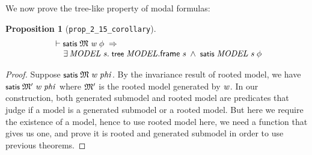 \documentclass[letterpaper]{article}
\newtheorem{prop}{Proposition}
\renewcommand{\HOLConst}[1]{{\textsf{\upshape\small #1}}}
\renewcommand{\HOLinline}[1]{\ensuremath{#1}}
\newenvironment{holmath}{\begin{displaymath}\begin{array}{l}}{\end{array}\end{displaymath}\ignorespacesafterend}
\begin{document}
We now prove the tree-like property of modal formulas:
\begin{prop}[\texttt{prop_2_15_corollary}]
\begin{holmath}
  \ensuremath{\HOLTokenTurnstile}\HOLConst{satis}\;\HOLFreeVar{\ensuremath{\mathfrak{M}}}\;\HOLFreeVar{w}\;\HOLFreeVar{\ensuremath{\phi}}\;\HOLSymConst{\HOLTokenImp{}}\\
\;\;\;\;\;\HOLSymConst{\HOLTokenExists{}}\HOLBoundVar{MODEL}\;\HOLBoundVar{s}.\;\HOLConst{tree}\;\HOLBoundVar{MODEL}.\HOLFieldName{frame}\;\HOLBoundVar{s}\;\HOLSymConst{\HOLTokenConj{}}\;\HOLConst{satis}\;\HOLBoundVar{MODEL}\;\HOLBoundVar{s}\;\HOLFreeVar{\ensuremath{\phi}}
\end{holmath}
\end{prop}
\begin{proof}
  Suppose \HOLinline{\HOLConst{satis}\;\HOLFreeVar{\ensuremath{\mathfrak{M}}}\;\HOLFreeVar{w}\;\HOLFreeVar{phi}}. By the invariance result of rooted model, we have \HOLinline{\HOLConst{satis}\;\HOLFreeVar{\ensuremath{\mathfrak{M}'}}\;\HOLFreeVar{w}\;\HOLFreeVar{phi}} where \HOLinline{\HOLFreeVar{\ensuremath{\mathfrak{M}'}}} is the rooted model generated by \HOLinline{\HOLFreeVar{w}}. In our construction, both generated submodel and rooted model are predicates that judge if a model is a generated submodel or a rooted model. But here we require the existence of a model, hence to use rooted model here, we need a function that gives us one, and prove it is rooted and generated submodel in order to use previous theorems.


\end{proof}
\end{document}
